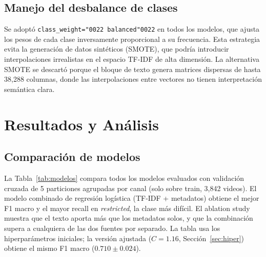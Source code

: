 \documentclass[conference]{IEEEtran}
\begin{document}
\subsection{Manejo del desbalance de clases}\label{sec:desbalance}
Se adoptó \texttt{class\_weight=\char"0022 balanced\char"0022} en todos los modelos, que ajusta los pesos de cada clase inversamente proporcional a su frecuencia. Esta estrategia evita la generación de datos sintéticos (SMOTE), que podría introducir interpolaciones irrealistas en el espacio TF-IDF de alta dimensión. La alternativa SMOTE se descartó porque el bloque de texto genera matrices dispersas de hasta 38,288 columnas, donde las interpolaciones entre vectores no tienen interpretación semántica clara.

\section{Resultados y Análisis}\label{sec:resultados}

\subsection{Comparación de modelos}\label{sec:comp}
La Tabla~\ref{tab:modelos} compara todos los modelos evaluados con validación cruzada de 5 particiones agrupadas por canal (solo sobre train, 3,842 videos). El modelo combinado de regresión logística (TF-IDF + metadatos) obtiene el mejor F1 macro y el mayor recall en \textit{restricted}, la clase más difícil. El ablation study muestra que el texto aporta más que los metadatos solos, y que la combinación supera a cualquiera de las dos fuentes por separado. La tabla usa los hiperparámetros iniciales; la versión ajustada ($C=1.16$, Sección~\ref{sec:hiper}) obtiene el mismo F1 macro ($0.710 \pm 0.024$).
\end{document}
